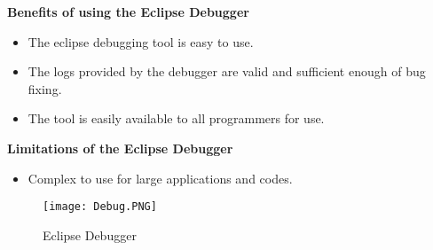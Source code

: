\documentclass{report}
\begin{document}
\textbf{Benefits of using the Eclipse Debugger}
\begin{itemize}
    \item The eclipse debugging tool is easy to use.
    \item The logs provided by the debugger are valid and sufficient enough of bug fixing.
    \item The tool is easily available to all programmers for use.
\end{itemize}
\textbf{Limitations of the Eclipse Debugger}
\begin{itemize}
    \item Complex to use for large applications and codes.
\end{itemize}
\begin{figure}[h!]
\centering
   \texttt{[image: Debug.PNG]}
   \caption{Eclipse Debugger}
\end{figure}
\pagebreak
\end{document}
